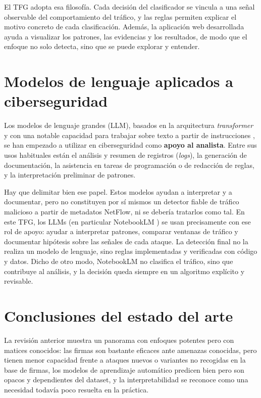 El TFG adopta esa filosofía. Cada decisión del clasificador se vincula a una señal observable del comportamiento del tráfico, y las reglas permiten explicar el motivo concreto de cada clasificación. Además, la aplicación web desarrollada ayuda a visualizar los patrones, las evidencias y los resultados, de modo que el enfoque no solo detecta, sino que se puede explorar y entender.

\section{Modelos de lenguaje aplicados a ciberseguridad}
\label{sec:arte_llms}

Los modelos de lenguaje grandes (LLM), basados en la arquitectura \emph{transformer} \cite{vaswani2017attention} y con una notable capacidad para trabajar sobre texto a partir de instrucciones \cite{brown2020language}, se han empezado a utilizar en ciberseguridad como \textbf{apoyo al analista}. Entre sus usos habituales están el análisis y resumen de registros (\emph{logs}), la generación de documentación, la asistencia en tareas de programación o de redacción de reglas, y la interpretación preliminar de patrones.

Hay que delimitar bien ese papel. Estos modelos ayudan a interpretar y a documentar, pero no constituyen por sí mismos un detector fiable de tráfico malicioso a partir de metadatos NetFlow, ni se debería tratarlos como tal. En este TFG, los LLMs (en particular NotebookLM \cite{notebooklm}) se usan precisamente con ese rol de apoyo: ayudar a interpretar patrones, comparar ventanas de tráfico y documentar hipótesis sobre las señales de cada ataque. La detección final no la realiza un modelo de lenguaje, sino reglas implementadas y verificadas con código y datos. Dicho de otro modo, NotebookLM no clasifica el tráfico, sino que contribuye al análisis, y la decisión queda siempre en un algoritmo explícito y revisable.

\section{Conclusiones del estado del arte}
\label{sec:arte_conclusiones}

La revisión anterior muestra un panorama con enfoques potentes pero con matices conocidos: las firmas son bastante eficaces ante amenazas conocidas, pero tienen menor capacidad frente a ataques nuevos o variantes no recogidas en la base de firmas, los modelos de aprendizaje automático predicen bien pero son opacos y dependientes del dataset, y la interpretabilidad se reconoce como una necesidad todavía poco resuelta en la práctica.

